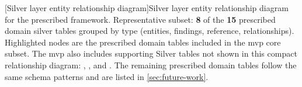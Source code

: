 \begin{center}
\begin{minipage}{\textwidth}
\begin{tikzpicture}
\end{tikzpicture}
[Silver layer entity relationship diagram]{Silver layer entity relationship diagram for the prescribed framework. Representative subset: \textbf{8} of the \textbf{15} prescribed domain silver tables grouped by type (entities, findings, reference, relationships). Highlighted nodes are the prescribed domain tables included in the \gls{mvp} core subset. The \gls{mvp} also includes supporting Silver tables not shown in this compact relationship diagram: , , and . The remaining prescribed domain tables follow the same schema patterns and are listed in \autoref{sec:future-work}.}
\label{fig:silver-erd}
\end{minipage}
\end{center}
